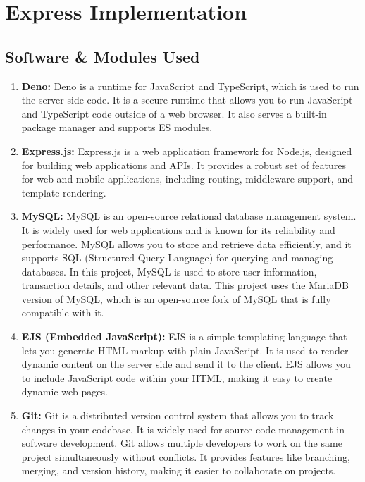 \chapter{Express Implementation}
\section{Software \& Modules Used}

\begin{enumerate}
  \item \textbf{Deno:}
    Deno is a runtime for JavaScript and TypeScript, which is used to run the
    server-side code. It is a secure runtime that allows you to run JavaScript
    and TypeScript code outside of a web browser. It also serves a built-in
    package manager and supports ES modules.

  \item \textbf{Express.js:}
    Express.js is a web application framework for Node.js, designed for
    building web applications and APIs. It provides a robust set of features
    for web and mobile applications, including routing, middleware support, and
    template rendering.

  \item \textbf{MySQL:}
    MySQL is an open-source relational database management system. It is widely
    used for web applications and is known for its reliability and performance.
    MySQL allows you to store and retrieve data efficiently, and it supports
    SQL (Structured Query Language) for querying and managing databases. In
    this project, MySQL is used to store user information, transaction details,
    and other relevant data. This project uses the MariaDB version of MySQL,
    which is an open-source fork of MySQL that is fully compatible with it.

  \item \textbf{EJS (Embedded JavaScript):}
    EJS is a simple templating language that lets you generate HTML markup with
    plain JavaScript. It is used to render dynamic content on the server side
    and send it to the client. EJS allows you to include JavaScript code within
    your HTML, making it easy to create dynamic web pages.

  \item \textbf{Git:}
    Git is a distributed version control system that allows you to track
    changes in your codebase. It is widely used for source code management in
    software development. Git allows multiple developers to work on the same
    project simultaneously without conflicts. It provides features like
    branching, merging, and version history, making it easier to collaborate on
    projects.


\end{enumerate}
